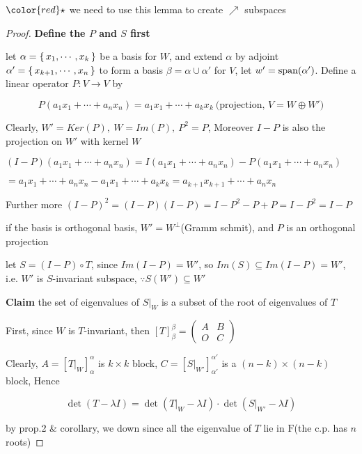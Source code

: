 $\color{red}\star $ we need to use this lemma to create $\nearrow$ subspaces

\newpage

\begin{proof}

	\textbf{Define the $P$ and $S$ first}

	let $\alpha = \left\{ \,x_1,\cdots,x_k \,\right\}$ be a basis for $W$, and extend $\alpha$ by adjoint $\alpha' = \left\{ \,x_{k+1},\cdots,x_n \,\right\}$ to form a basis $\beta = \alpha \cup \alpha'$ for $V$, let $w' = \text{span($\alpha'$)}$. Define a linear operator $P:V \rightarrow V$ by
	
	 $$P(a_1x_1+\cdots+a_nx_n) = a_1x_1 + \cdots + a_kx_k~ \text{(projection, $V = W \oplus W'$)}$$
	 
	 Clearly, $W' = Ker(P),~W = Im(P),~P^2 = P$, Moreover $I - P$ is also the projection on $W'$ with kernel $W$
	 
	 \begin{tcolorbox}
	 	$(I-P)(a_1x_1+\cdots+a_nx_n)=I(a_1x_1+\cdots+a_nx_n)-P(a_1x_1+\cdots+a_nx_n)$
	 	
	 	$=a_1x_1+\cdots+a_nx_n-a_1x_1+\cdots+a_kx_k = a_{k+1}x_{k+1} + \cdots + a_nx_n$
	 	
	 	Further more $(I - P)^2 = (I-P)(I-P) = I-P^2 - P + P = I-P^2 = I - P $
	 \end{tcolorbox}
	 
	 if the basis is orthogonal basis, $W' = W^{\perp}$(Gramm schmit), and $P$ is an orthogonal projection
	 
	 let $S = (I-P)\circ T$, since $Im(I-P) = W'$, so $Im(S) \subseteq Im(I-P) = W'$, i.e. $W'$ is $S$-invariant subspace, $\because S(W') \subseteq W'$
	 
	 \textbf{Claim} the set of eigenvalues of $S|_W$ is a subset of the root of eigenvalues of $T$
	 
	 First, since $W$ is $T$-invariant, then $[T]^{\beta}_{\beta} = \left( \begin{matrix}
	 	A&B\\O&C
	 \end{matrix}\right)$
	 
	 Clearly, $A = \left[ T|_W\right]^{\alpha}_{\alpha}$ is $k \times k$ block, $C = \left[ S|_{W'}\right]^{\alpha'}_{\alpha'}$ is a $(n-k) \times (n-k)$ block, Hence 
	 
	 $$\det(T - \lambda I) = \det(T|_W - \lambda I)\cdot \det(S|_{W'} - \lambda I)$$
	 
	 by prop.2 \& corollary, we down since all the eigenvalue of $T$ lie in $\mathrm F$(the c.p. has $n$ roots)
	 

\end{proof}

